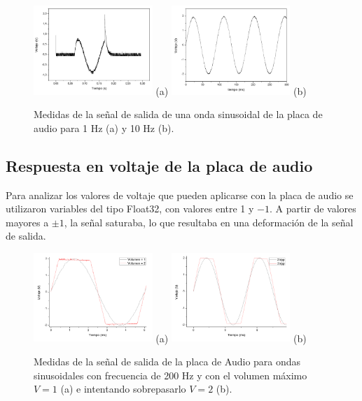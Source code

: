 \documentclass[a4paper,10pt]{article}
\begin{document}
\begin{figure}[h!]
 \centering
 \includegraphics[width=0.40\textwidth]{V2-f1Hz.jpg} (a)
 \hspace{0.1cm}
 \includegraphics[width=0.40\textwidth]{V2-f10Hz.jpg} (b)
 \label{fig:frecuenciaminima}
 \caption{Medidas de la señal de salida de una onda sinusoidal de la 
 placa de audio para 1 Hz (a) y 10 Hz (b).}
\end{figure}

\subsection{Respuesta en voltaje de la placa de audio}
Para analizar los valores de voltaje que pueden aplicarse con la
placa de audio se utilizaron variables del tipo Float32, con 
valores entre 1 y $-1$. A partir de valores mayores a 
$\pm1$, la señal saturaba, lo que resultaba en una deformación de 
la señal de salida. 

\begin{figure}[h!]
 \centering
 \includegraphics[width=0.40\textwidth]{Entrada-Volumen.jpg} (a)
 \hspace{0.1cm}
 \includegraphics[width=0.40\textwidth]{PlacaAudio-Adq.jpg} (b)
 \label{fig:frecuenciaminima}
 \caption{Medidas de la señal de salida de la placa de Audio para ondas 
 sinusoidales con frecuencia de 200 Hz y con el volumen máximo $V=1$ (a) 
 e intentando sobrepasarlo $V=2$ (b).}
\end{figure}
\end{document}
